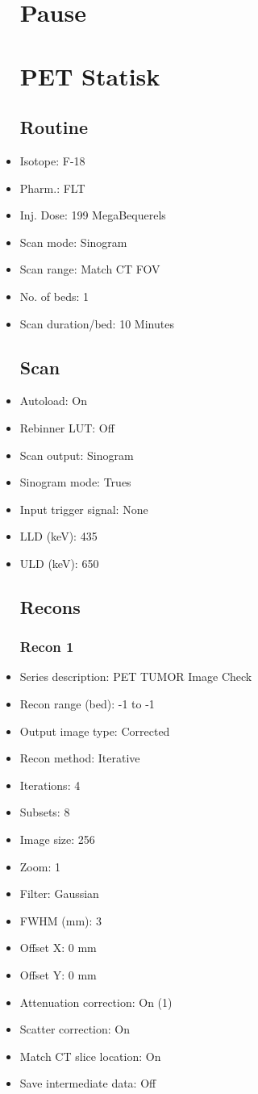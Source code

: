 \documentclass[12pt]{article}
\begin{document}
\begin{itemize}[noitemsep]
\section{Pause}
\section{PET Statisk}\subsection{Routine}
\item Isotope: F-18
\item Pharm.: FLT
\item Inj. Dose: 199 MegaBequerels
\item Scan mode: Sinogram
\item Scan range: Match CT FOV
\item No. of beds: 1
\item Scan duration/bed: 10 Minutes
\subsection{Scan}
\item Autoload: On
\item Rebinner LUT: Off
\item Scan output: Sinogram
\item Sinogram mode: Trues
\item Input trigger signal: None
\item LLD (keV): 435
\item ULD (keV): 650
\subsection{Recons}
\subsubsection{Recon 1}
\item Series description: PET TUMOR Image Check
\item Recon range (bed): -1 to -1
\item Output image type: Corrected
\item Recon method: Iterative
\item Iterations: 4
\item Subsets: 8
\item Image size: 256
\item Zoom: 1
\item Filter: Gaussian
\item FWHM (mm): 3
\item Offset X: 0 mm
\item Offset Y: 0 mm
\item Attenuation correction: On (1)
\item Scatter correction: On
\item Match CT slice location: On
\item Save intermediate data: Off

\end{itemize}
\end{document}
